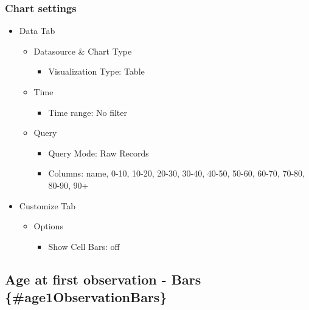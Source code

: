 \documentclass[
]{book}
\providecommand{\tightlist}{%
  \setlength{\itemsep}{0pt}\setlength{\parskip}{0pt}}
\begin{document}
\hypertarget{chart-settings-8}{%
\subsubsection*{Chart settings}\label{chart-settings-8}}

\begin{itemize}
\tightlist
\item
  Data Tab

  \begin{itemize}
  \tightlist
  \item
    Datasource \& Chart Type

    \begin{itemize}
    \tightlist
    \item
      Visualization Type: Table
    \end{itemize}
  \item
    Time

    \begin{itemize}
    \tightlist
    \item
      Time range: No filter
    \end{itemize}
  \item
    Query

    \begin{itemize}
    \tightlist
    \item
      Query Mode: Raw Records
    \item
      Columns: name, 0-10, 10-20, 20-30, 30-40, 40-50, 50-60, 60-70, 70-80, 80-90, 90+
    \end{itemize}
  \end{itemize}
\item
  Customize Tab

  \begin{itemize}
  \tightlist
  \item
    Options

    \begin{itemize}
    \tightlist
    \item
      Show Cell Bars: off
    \end{itemize}
  \end{itemize}
\end{itemize}

\hypertarget{age-at-first-observation---bars-age1observationbars}{%
\subsection*{Age at first observation - Bars \{\#age1ObservationBars\}}\label{age-at-first-observation---bars-age1observationbars}}
\end{document}

